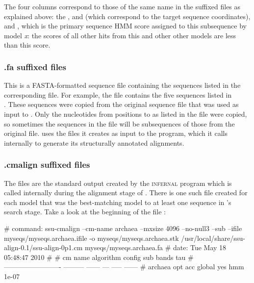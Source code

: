 The four columns correspond to those of the same name in the 
suffixed files as explained above: the ,
 and  (which correspond to the target sequence
coordinates), and , which is the primary sequence HMM
score assigned to this subsequence by model \emph{x}: the scores of
all other hits from this and other other models are less than
this score.

\subsubsection{.fa suffixed files}
This is a FASTA-formatted sequence file containing the sequences
listed in the corresponding  file. For example, the
file  contains the five sequences
listed in \\
. These sequences were
copied from the original sequence file  that
was used as input to . Only the nucleotides from
positions  to  as listed in the
 file were copied, so sometimes the sequences in the
 file will be subsequences of those from the original
file.   uses the  files it
creates as input to the  program, which it calls
internally to generate its structurally annotated alignments.

\subsubsection{.cmalign suffixed files}

The  files are the standard output created by the
\textsc{infernal} program  which is called internally
during the alignment stage of . There is one such file
created for each model that was the best-matching model to at least
one sequence in 's search stage. Take a look at the
beginning of the file :

\begin{sreoutputwide}
# command: ssu-cmalign --cm-name archaea --mxsize 4096 --no-null3 --sub --ifile myseqs/myseqs.archaea.ifile 
-o myseqs/myseqs.archaea.stk /usr/local/share/ssu-align-0.1/ssu-align-0p1.cm myseqs/myseqs.archaea.fa
# date:    Tue May 18 05:48:47 2010
#
# cm name                    algorithm  config  sub  bands     tau
# -------------------------  ---------  ------  ---  -----  ------
# archaea                      opt acc  global  yes    hmm   1e-07
\end{sreoutputwide}

